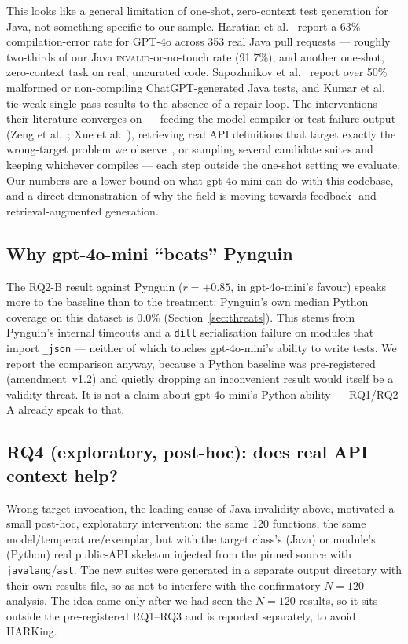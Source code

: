 This looks like a general limitation of one-shot, zero-context test generation for Java,
not something specific to our sample. Haratian et al.~\cite{haratian2026praware} report a
63\% compilation-error rate for GPT-4o across 353 real Java pull requests --- roughly
two-thirds of our Java \textsc{invalid}-or-no-touch rate (91.7\%), and another one-shot,
zero-context task on real, uncurated code. Sapozhnikov
et al.~\cite{sapozhnikov2024empirical} report over 50\% malformed or non-compiling
ChatGPT-generated Java tests, and Kumar et al.~\cite{kumar2025empirical} tie weak
single-pass results to the absence of a repair loop. The interventions their literature
converges on --- feeding the model compiler or test-failure output
(Zeng et al.~\cite{zeng2026logic}; Xue et al.~\cite{xue2025distinct}), retrieving real API
definitions that target exactly the wrong-target problem we
observe~\cite{liu2025typeaware}, or sampling several candidate suites and keeping whichever
compiles --- each step outside the one-shot setting we evaluate. Our numbers are a lower
bound on what gpt-4o-mini can do with this codebase, and a direct demonstration of why the
field is moving towards feedback- and retrieval-augmented generation.

\subsection{Why gpt-4o-mini ``beats'' Pynguin}
The RQ2-B result against Pynguin ($r=+0.85$, in gpt-4o-mini's favour) speaks more to the
baseline than to the treatment: Pynguin's own median Python coverage on this dataset is
0.0\% (Section~\ref{sec:threats}). This stems from Pynguin's internal timeouts and a
\texttt{dill} serialisation failure on modules that import \texttt{\_json} --- neither of
which touches gpt-4o-mini's ability to write tests. We report the comparison anyway,
because a Python baseline was pre-registered (amendment~v1.2) and quietly dropping an
inconvenient result would itself be a validity threat. It is not a claim about
gpt-4o-mini's Python ability --- RQ1/RQ2-A already speak to that.

\subsection{RQ4 (exploratory, post-hoc): does real API context help?}
\label{sec:rq4}
Wrong-target invocation, the leading cause of Java invalidity above, motivated a small
post-hoc, exploratory intervention: the same 120 functions, the same
model/temperature/exemplar, but with the target class's (Java) or module's (Python) real
public-API skeleton injected from the pinned source with \texttt{javalang}/\texttt{ast}.
The new suites were generated in a separate output directory with their own results file,
so as not to interfere with the confirmatory $N=120$ analysis. The idea came only after we
had seen the $N=120$ results, so it sits outside the pre-registered RQ1--RQ3 and is
reported separately, to avoid HARKing.

